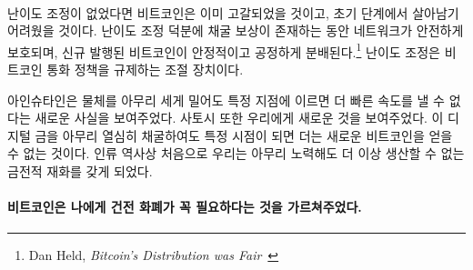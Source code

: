 \paragraph{}
\begin{comment}	
	If it weren't for this difficulty adjustment, all bitcoins would have been mined
	already. If it weren't for this difficulty adjustment, Bitcoin probably wouldn't
	have survived in its infancy. It is what secures the network in its reward era.
	It is what ensures a steady and fair distribution\footnote{Dan Held,
		\textit{Bitcoin's Distribution was Fair}~\cite{distribution-was-fair}} of new
	bitcoin. It is the thermostat which regulates Bitcoin's monetary policy.
\end{comment}
난이도 조정이 없었다면 비트코인은 이미 고갈되었을 것이고, 초기 단계에서 살아남기 어려웠을 것이다.
난이도 조정 덕분에 채굴 보상이 존재하는 동안 네트워크가 안전하게 보호되며,
신규 발행된 비트코인이 안정적이고 공정하게 분배된다.\footnote{Dan Held,
	\textit{Bitcoin’s Distribution was Fair}~\cite{distribution-was-fair}}
난이도 조정은 비트코인 통화 정책을 규제하는 조절 장치이다.

\begin{comment}	
	Einstein showed us something novel: no matter how hard you push an
	object, at a certain point you won't be able to get more speed out of
	it. Satoshi also showed us something novel: no matter how hard you dig
	for this digital gold, at a certain point you won't be able to get more
	bitcoin out of it. For the first time in human history, we have a
	monetary good which, no matter how hard you try, you won't be able to
	produce more of.
\end{comment}
아인슈타인은 물체를 아무리 세게 밀어도 특정 지점에 이르면 더 빠른 속도를 낼 수 없다는 새로운 사실을 보여주었다. 
사토시 또한 우리에게 새로운 것을 보여주었다. 
이 디지털 금을 아무리 열심히 채굴하여도 특정 시점이 되면 더는 새로운 비트코인을 얻을 수 없는 것이다. 
인류 역사상 처음으로 우리는 아무리 노력해도 더 이상 생산할 수 없는 금전적 재화를 갖게 되었다.

\paragraph{비트코인은 나에게 건전 화폐가 꼭 필요하다는 것을 가르쳐주었다.}

